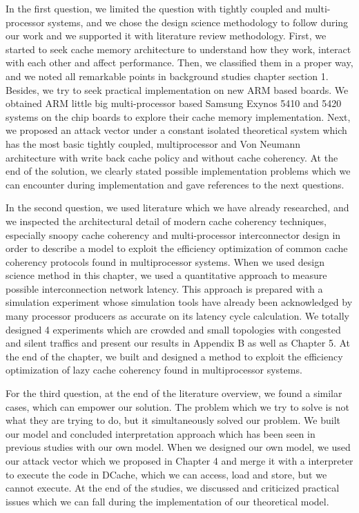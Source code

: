 	In the first question, we limited the question with tightly coupled and multi-processor systems, and we chose the design science methodology to follow during our work and we supported it with literature review methodology. First, we started to seek cache memory architecture to understand how they work, interact with each other and affect performance. Then, we classified them in a proper way, and we noted all remarkable points in background studies chapter section 1. Besides, we try to seek practical implementation on new ARM based boards. We obtained ARM little big multi-processor based Samsung Exynos 5410 and 5420 systems on the chip boards to explore their cache memory implementation. Next, we proposed an attack vector under a constant isolated theoretical system which has the most basic tightly coupled, multiprocessor and Von Neumann architecture with write back cache policy and without cache coherency. At the end of the solution, we clearly stated possible implementation problems which we can encounter during implementation and gave references to the next questions.

	In the second question, we used literature which we have already researched, and we inspected the architectural detail of modern cache coherency techniques, especially snoopy cache coherency and multi-processor interconnector design in order to describe a model to exploit the efficiency optimization of common cache coherency protocols found in multiprocessor systems. When we used design science method in this chapter, we used a quantitative approach to measure possible interconnection network latency. This approach is prepared with a simulation experiment whose simulation tools have already been acknowledged by many processor producers as accurate on its latency cycle calculation. We totally designed 4 experiments which are crowded and small topologies with congested and silent traffics and present our results in Appendix B as well as Chapter 5. 
	At the end of the chapter, we built and designed a method to exploit the efficiency optimization of lazy cache coherency found in multiprocessor systems.

	For the third question, at the end of the literature overview, we found a similar cases\cite{sparks2005shadow}\cite{yan2008revealing}, which can empower our solution. The problem which we try to solve is not what they are trying to do, but it simultaneously solved our problem. We built our model and concluded interpretation approach which has been seen in previous studies with our own model. When we designed our own model, we used our attack vector which we proposed in Chapter 4 and merge it with a interpreter to execute the code in DCache, which we can access, load and store, but we cannot execute. At the end of the studies, we discussed and criticized practical issues which we can fall during the implementation of our theoretical model. 

